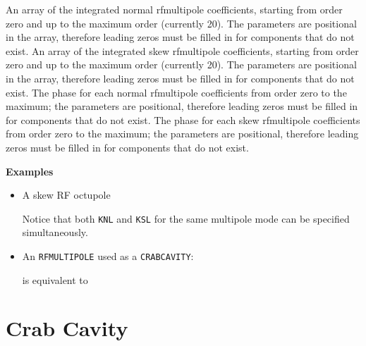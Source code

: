 \begin{madlist}
    An array of the integrated normal rfmultipole
     coefficients, starting from order zero and up to the maximum
     order (currently 20).
     The parameters are positional in the array, therefore leading
     zeros must be filled in for components that do not exist.
    An array of the integrated skew rfmultipole
     coefficients, starting from order zero and up to the maximum
     order (currently 20).
     The parameters are positional in the array, therefore leading
     zeros must be filled in for components that do not exist.
    The phase for each normal rfmultipole coefficients from
     order zero to the maximum; the parameters are positional,
     therefore leading zeros must be filled in for components that do not
     exist.
    The phase for each skew rfmultipole coefficients from
     order zero to the maximum; the parameters are positional,
     therefore leading zeros must be filled in for components that do not
     exist.
\end{madlist}

\textbf{Examples}
\begin{itemize}
	\item A skew RF octupole

Notice that both \texttt{KNL} and \texttt{KSL} for the same multipole mode can be specified simultaneously.

\item An \texttt{RFMULTIPOLE} used as a \texttt{CRABCAVITY}:

is equivalent to


\end{itemize}

\section{Crab Cavity}
\label{sec:crab-cavity}\label{sec:crabcavity}

